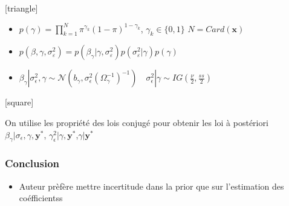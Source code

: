 \documentclass{presentation_template}
\begin{document}
\begin{frame}
\begin{columns}
\begin{column}{0.2\textwidth}
        \end{column}
\end{columns}
\vspace{-1.5cm}
       [triangle]
        \begin{itemize}
            \item  $\displaystyle p(\gamma)=\prod_{k=1}^{N} \pi^{\gamma_k}(1-\pi)^{1-\gamma_k}$, $\gamma_k \in \{0,1 \}$ {\small $N = Card(\mathbf{x})$} 
            \item $p\left(\beta, \gamma, \sigma_{\varepsilon}^{2}\right)=p\left(\beta_{\gamma} | \gamma, \sigma_{\varepsilon}^{2}\right) p\left(\sigma_{\varepsilon}^{2} | \gamma\right) p(\gamma)$ 
            \item $
                \beta_{\gamma}\left|\sigma_{\epsilon}^{2}, \gamma \sim \mathcal{N}\left(b_{\gamma},
                \sigma_{\epsilon}^{2}\left(\Omega_{\gamma}^{-1}\right)^{-1}\right) \quad \sigma_{\epsilon}^{2}\right| \gamma \sim IG\left(\frac{\nu}{2}, \frac{s s}{2}\right)
                $
        \end{itemize}
        [square]
   
    
    On utilise les propriété des lois conjugé pour obtenir les loi à postériori $\beta_{\gamma} | \sigma_{\epsilon}, \gamma, \mathbf{y}^{*}$, $\gamma_\epsilon^{2} | \gamma, \mathbf{y}^{*}$,$\gamma | \mathbf{y}^{*}$

\end{frame}































\begin{frame}
    \frametitle{Conclusion}

    \begin{itemize}
        \item Auteur prèfère mettre incertitude dans la prior que sur l'estimation des coéfficientss
    \end{itemize}
\end{frame}
\end{document}
